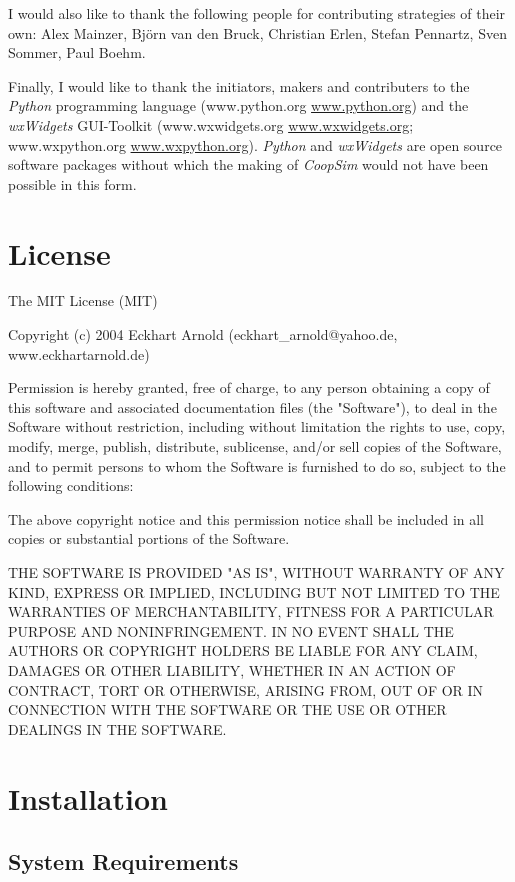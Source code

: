 \documentclass[12pt,a4paper,USenglish]{article}
\begin{document}
I would also like to thank the following people for contributing
strategies of their own: Alex Mainzer, Björn van den Bruck, 
Christian Erlen, Stefan Pennartz, Sven Sommer, Paul Boehm.

Finally, I would like to thank the initiators, makers and contributers
to the \emph{Python} programming language (www.python.org
\url{www.python.org}) and the \emph{wxWidgets} GUI-Toolkit
(www.wxwidgets.org \url{www.wxwidgets.org}; www.wxpython.org
\url{www.wxpython.org}). \emph{Python} and \emph{wxWidgets} are open
source software packages without which the making of \emph{CoopSim}
would not have been possible in this form.

\section{License}

The MIT License (MIT)

Copyright (c) 2004 Eckhart Arnold (eckhart\_arnold@yahoo.de, www.eckhartarnold.de)

Permission is hereby granted, free of charge, to any person obtaining a copy
of this software and associated documentation files (the "Software"), to deal
in the Software without restriction, including without limitation the rights
to use, copy, modify, merge, publish, distribute, sublicense, and/or sell
copies of the Software, and to permit persons to whom the Software is
furnished to do so, subject to the following conditions:

The above copyright notice and this permission notice shall be included in
all copies or substantial portions of the Software.

THE SOFTWARE IS PROVIDED "AS IS", WITHOUT WARRANTY OF ANY KIND, EXPRESS OR
IMPLIED, INCLUDING BUT NOT LIMITED TO THE WARRANTIES OF MERCHANTABILITY,
FITNESS FOR A PARTICULAR PURPOSE AND NONINFRINGEMENT. IN NO EVENT SHALL THE
AUTHORS OR COPYRIGHT HOLDERS BE LIABLE FOR ANY CLAIM, DAMAGES OR OTHER
LIABILITY, WHETHER IN AN ACTION OF CONTRACT, TORT OR OTHERWISE, ARISING FROM,
OUT OF OR IN CONNECTION WITH THE SOFTWARE OR THE USE OR OTHER DEALINGS IN
THE SOFTWARE.

\section{Installation}

\subsection{System Requirements}
\end{document}
